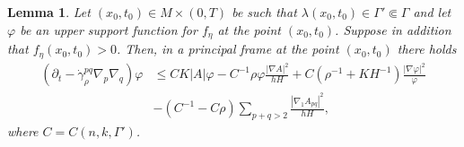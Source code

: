\documentclass[12pt]{amsart}
\newtheorem{lemma}[theorem]{Lemma}
\begin{document}
\begin{lemma}
\label{lem:f_stamp_1}
Let $(x_0,t_0)\in M\times (0,T)$ be such that $\lambda(x_0,t_0) \in \Gamma' \Subset \Gamma$ and let $\varphi$ be an upper support function for $f_\eta$ at the point $(x_0,t_0)$. Suppose in addition that $f_\eta(x_0,t_0) > 0$. Then, in a principal frame at the point $(x_0,t_0)$ there holds 
\begin{align*}
(\partial_t - \dot \gamma_\rho^{pq} \nabla_p \nabla_q) \varphi & \leq CK|A| \varphi  - C^{-1} \rho \varphi \frac{|\nabla A|^2}{hH} + C(\rho^{-1} + KH^{-1} )  \frac{|\nabla \varphi|^2}{ \varphi }\\
&-(C^{-1}- C \rho) \sum_{p+q> 2} \frac{|\nabla_1 A_{pq}|^2}{h H},
\end{align*}
where $C = C(n,k,\Gamma')$. 
\end{lemma}
\end{document}
